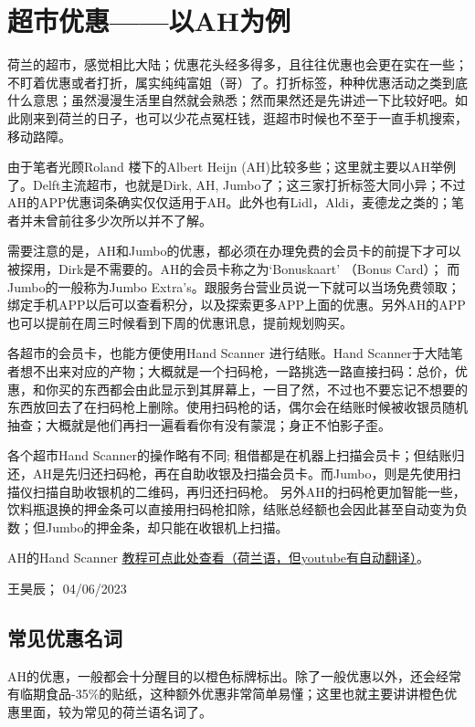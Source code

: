 \vspace{\betsubsec} %
\section{超市优惠——以AH为例}
荷兰的超市，感觉相比大陆；优惠花头经多得多，且往往优惠也会更在实在一些；不盯着优惠或者打折，属实纯纯富姐（哥）了。打折标签，种种优惠活动之类到底什么意思；虽然漫漫生活里自然就会熟悉；然而果然还是先讲述一下比较好吧。如此刚来到荷兰的日子，也可以少花点冤枉钱，逛超市时候也不至于一直手机搜索，移动路障。

由于笔者光顾Roland 楼下的Albert Heijn (AH)比较多些；这里就主要以AH举例了。Delft主流超市，也就是Dirk, AH, Jumbo了；这三家打折标签大同小异；不过AH的APP优惠词条确实仅仅适用于AH。此外也有Lidl，Aldi，麦德龙之类的；笔者并未曾前往多少次所以并不了解。

需要注意的是，AH和Jumbo的优惠，都必须在办理免费的会员卡的前提下才可以被探用，Dirk是不需要的。AH的会员卡称之为‘Bonuskaart’ （Bonus Card）； 而Jumbo的一般称为Jumbo Extra's。跟服务台营业员说一下就可以当场免费领取；绑定手机APP以后可以查看积分，以及探索更多APP上面的优惠。另外AH的APP也可以提前在周三时候看到下周的优惠讯息，提前规划购买。

各超市的会员卡，也能方便使用Hand Scanner 进行结账。Hand Scanner于大陆笔者想不出来对应的产物；大概就是一个扫码枪，一路挑选一路直接扫码：总价，优惠，和你买的东西都会由此显示到其屏幕上，一目了然，不过也不要忘记不想要的东西放回去了在扫码枪上删除。使用扫码枪的话，偶尔会在结账时候被收银员随机抽查；大概就是他们再扫一遍看看你有没有蒙混；身正不怕影子歪。

各个超市Hand Scanner的操作略有不同; 租借都是在机器上扫描会员卡；但结账归还，AH是先归还扫码枪，再在自助收银及扫描会员卡。而Jumbo，则是先使用扫描仪扫描自助收银机的二维码，再归还扫码枪。 另外AH的扫码枪更加智能一些，饮料瓶退换的押金条可以直接用扫码枪扣除，结账总经额也会因此甚至自动变为负数；但Jumbo的押金条，却只能在收银机上扫描。

AH的Hand Scanner \href{https://www.youtube.com/watch?v=7MSqE_vt5Po}{\uline{教程可点此处查看（荷兰语，但youtube有自动翻译）}}。
\begin{flushright}
王昊辰； 04/06/2023
\end{flushright}



\subsection{常见优惠名词}
AH的优惠，一般都会十分醒目的以橙色标牌标出。除了一般优惠以外，还会经常有临期食品-35\%的贴纸，这种额外优惠非常简单易懂；这里也就主要讲讲橙色优惠里面，较为常见的荷兰语名词了。

